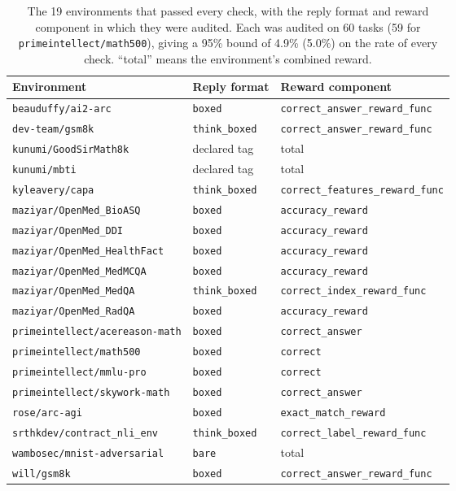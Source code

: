 \begin{table}[h]
\centering
\small
\caption{The 19 environments that passed every check, with the reply format and reward component in which they were audited. Each was audited on 60 tasks (59 for \texttt{primeintellect/math500}), giving a 95\% bound of 4.9\% (5.0\%) on the rate of every check. ``total'' means the environment's combined reward.}
\label{tab:passed}
\begin{tabular}{@{}l l l@{}}
\toprule
Environment & Reply format & Reward component \\
\midrule
\texttt{beauduffy/ai2-arc} & \texttt{boxed} & \texttt{correct\_answer\_reward\_func} \\
\texttt{dev-team/gsm8k} & \texttt{think\_boxed} & \texttt{correct\_answer\_reward\_func} \\
\texttt{kunumi/GoodSirMath8k} & declared tag & total \\
\texttt{kunumi/mbti} & declared tag & total \\
\texttt{kyleavery/capa} & \texttt{think\_boxed} & \texttt{correct\_features\_reward\_func} \\
\texttt{maziyar/OpenMed\_BioASQ} & \texttt{boxed} & \texttt{accuracy\_reward} \\
\texttt{maziyar/OpenMed\_DDI} & \texttt{boxed} & \texttt{accuracy\_reward} \\
\texttt{maziyar/OpenMed\_HealthFact} & \texttt{boxed} & \texttt{accuracy\_reward} \\
\texttt{maziyar/OpenMed\_MedMCQA} & \texttt{boxed} & \texttt{accuracy\_reward} \\
\texttt{maziyar/OpenMed\_MedQA} & \texttt{think\_boxed} & \texttt{correct\_index\_reward\_func} \\
\texttt{maziyar/OpenMed\_RadQA} & \texttt{boxed} & \texttt{accuracy\_reward} \\
\texttt{primeintellect/acereason-math} & \texttt{boxed} & \texttt{correct\_answer} \\
\texttt{primeintellect/math500} & \texttt{boxed} & \texttt{correct} \\
\texttt{primeintellect/mmlu-pro} & \texttt{boxed} & \texttt{correct} \\
\texttt{primeintellect/skywork-math} & \texttt{boxed} & \texttt{correct\_answer} \\
\texttt{rose/arc-agi} & \texttt{boxed} & \texttt{exact\_match\_reward} \\
\texttt{srthkdev/contract\_nli\_env} & \texttt{think\_boxed} & \texttt{correct\_label\_reward\_func} \\
\texttt{wambosec/mnist-adversarial} & \texttt{bare} & total \\
\texttt{will/gsm8k} & \texttt{boxed} & \texttt{correct\_answer\_reward\_func} \\
\bottomrule
\end{tabular}
\end{table}


